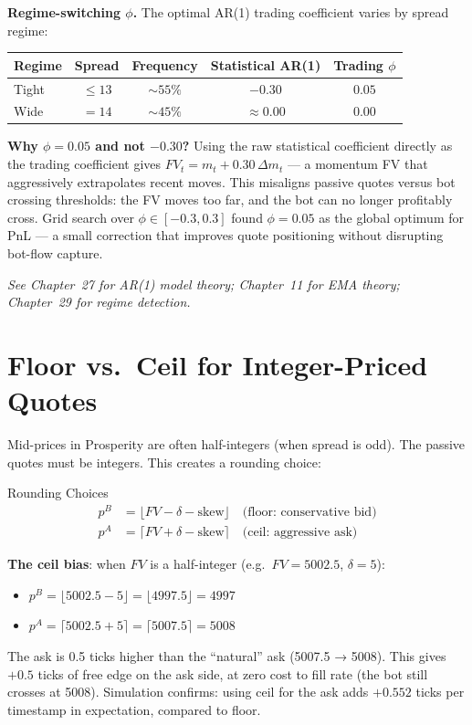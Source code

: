 \documentclass[12pt,a4paper,openany]{report}
\theoremstyle{definition}
\begin{document}
\textbf{Regime-switching $\phi$.} The optimal AR(1) trading coefficient varies by spread regime:

\begin{center}
\begin{tabular}{lcccc}
\toprule
\textbf{Regime} & \textbf{Spread} & \textbf{Frequency} & \textbf{Statistical AR(1)} & \textbf{Trading $\phi$} \\
\midrule
Tight & $\leq 13$ & $\sim 55\%$ & $-0.30$ & $0.05$ \\
Wide  & $= 14$   & $\sim 45\%$ & $\approx 0.00$ & $0.00$ \\
\bottomrule
\end{tabular}
\end{center}

\textbf{Why $\phi = 0.05$ and not $-0.30$?} Using the raw statistical coefficient directly as the trading coefficient gives $FV_t = m_t + 0.30\,\Delta m_t$ — a momentum FV that aggressively extrapolates recent moves. This misaligns passive quotes versus bot crossing thresholds: the FV moves too far, and the bot can no longer profitably cross. Grid search over $\phi \in [-0.3, 0.3]$ found $\phi = 0.05$ as the global optimum for PnL — a small correction that improves quote positioning without disrupting bot-flow capture.

\textit{See Chapter~27 for AR(1) model theory; Chapter~11 for EMA theory; Chapter~29 for regime detection.}

\section{Floor vs.\ Ceil for Integer-Priced Quotes}

Mid-prices in Prosperity are often half-integers (when spread is odd). The passive quotes must be integers. This creates a rounding choice:

\begin{definitionbox}{Rounding Choices}
\begin{align}
  p^B &= \lfloor FV - \delta - \text{skew} \rfloor \quad \text{(floor: conservative bid)} \\
  p^A &= \lceil FV + \delta - \text{skew} \rceil \quad \text{(ceil: aggressive ask)}
\end{align}
\end{definitionbox}

\textbf{The ceil bias}: when $FV$ is a half-integer (e.g.\ $FV = 5002.5$, $\delta = 5$):
\begin{itemize}
  \item $p^B = \lfloor 5002.5 - 5 \rfloor = \lfloor 4997.5 \rfloor = 4997$
  \item $p^A = \lceil 5002.5 + 5 \rceil = \lceil 5007.5 \rceil = 5008$
\end{itemize}
The ask is 0.5 ticks higher than the ``natural'' ask (5007.5 → 5008). This gives $+0.5$ ticks of free edge on the ask side, at zero cost to fill rate (the bot still crosses at 5008). Simulation confirms: using ceil for the ask adds $+0.552$ ticks per timestamp in expectation, compared to floor.
\end{document}
